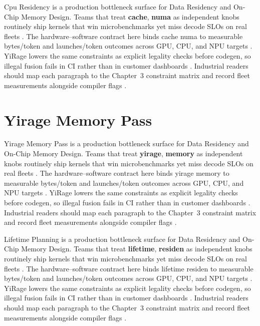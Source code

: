 Cpu Residency is a production bottleneck surface for Data Residency and On-Chip Memory Design. Teams that treat \textbf{cache}, \textbf{numa} as independent knobs routinely ship kernels that win microbenchmarks yet miss decode SLOs on real fleets \citep{nvidia2022hopper,amd2024aie}. The hardware--software contract here binds cache numa to measurable bytes/token and launches/token outcomes across GPU, CPU, and NPU targets \citep{semianalysis2024tma,dlbook}. YiRage lowers the same constraints as explicit legality checks before codegen, so illegal fusion fails in CI rather than in customer dashboards \citep{amd2024xdna,dao2022flashattention}. Industrial readers should map each paragraph to the Chapter~3 constraint matrix and record fleet measurements alongside compiler flags \citep{amd2024aie,kwon2023vllm}.

\section{Yirage Memory Pass}
\label{sec:yirage_memory_pass}

Yirage Memory Pass is a production bottleneck surface for Data Residency and On-Chip Memory Design. Teams that treat \textbf{yirage}, \textbf{memory} as independent knobs routinely ship kernels that win microbenchmarks yet miss decode SLOs on real fleets \citep{semianalysis2024tma,dlbook}. The hardware--software contract here binds yirage memory to measurable bytes/token and launches/token outcomes across GPU, CPU, and NPU targets \citep{amd2024xdna,dao2022flashattention}. YiRage lowers the same constraints as explicit legality checks before codegen, so illegal fusion fails in CI rather than in customer dashboards \citep{amd2024aie,kwon2023vllm}. Industrial readers should map each paragraph to the Chapter~3 constraint matrix and record fleet measurements alongside compiler flags \citep{dlbook,nvidia2024cudagraphs}.

Lifetime Planning is a production bottleneck surface for Data Residency and On-Chip Memory Design. Teams that treat \textbf{lifetime}, \textbf{residen} as independent knobs routinely ship kernels that win microbenchmarks yet miss decode SLOs on real fleets \citep{memoryfloor2026,amd2024xdna}. The hardware--software contract here binds lifetime residen to measurable bytes/token and launches/token outcomes across GPU, CPU, and NPU targets \citep{nvidia2022hopper,amd2024aie}. YiRage lowers the same constraints as explicit legality checks before codegen, so illegal fusion fails in CI rather than in customer dashboards \citep{semianalysis2024tma,dlbook}. Industrial readers should map each paragraph to the Chapter~3 constraint matrix and record fleet measurements alongside compiler flags \citep{amd2024xdna,dao2022flashattention}.

